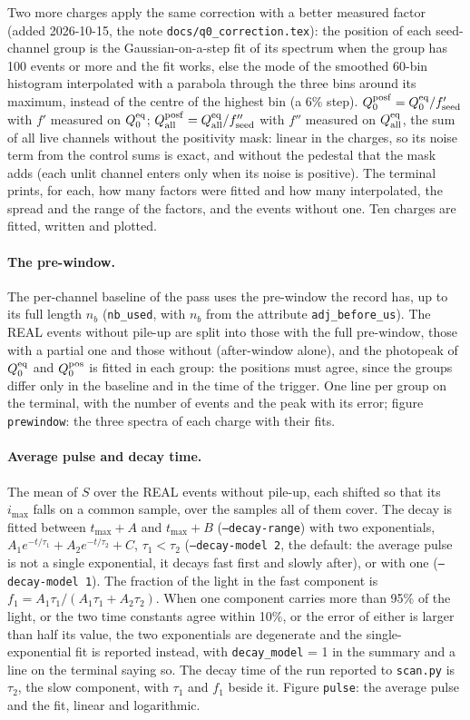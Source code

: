 \documentclass[11pt]{article}
\newcommand{\code}[1]{\texttt{#1}}
\begin{document}
Two more charges apply the same correction with a better measured
factor (added 2026-10-15, the note \code{docs/q0\_correction.tex}): the
position of each seed-channel group is the Gaussian-on-a-step fit of its
spectrum when the group has 100 events or more and the fit works, else
the mode of the smoothed 60-bin histogram interpolated with a parabola
through the three bins around its maximum, instead of the centre of the
highest bin (a 6\% step). $Q^{\rm posf}_0 = Q^{\rm eq}_0 / f'_{\rm seed}$
with $f'$ measured on $Q^{\rm eq}_0$; $Q^{\rm posf}_{\rm all} =
Q^{\rm eq}_{\rm all} / f''_{\rm seed}$ with $f''$ measured on
$Q^{\rm eq}_{\rm all}$, the sum of all live channels without the
positivity mask: linear in the charges, so its noise term from the
control sums is exact, and without the pedestal that the mask adds (each
unlit channel enters only when its noise is positive). The terminal
prints, for each, how many factors were fitted and how many
interpolated, the spread and the range of the factors, and the events
without one. Ten charges are fitted, written and plotted.

\paragraph{The pre-window.} The per-channel baseline of the pass uses
the pre-window the record has, up to its full length $n_b$
(\code{nb\_used}, with $n_b$ from the attribute \code{adj\_before\_us}).
The REAL events without pile-up are split into those with the full
pre-window, those with a partial one and those without (after-window
alone), and the photopeak of $Q^{\rm eq}_0$ and $Q^{\rm pos}_0$ is fitted
in each group: the positions must agree, since the groups differ only in
the baseline and in the time of the trigger. One line per group on the
terminal, with the number of events and the peak with its error; figure
\code{prewindow}: the three spectra of each charge with their fits.

\paragraph{Average pulse and decay time.} The mean of $S$ over the REAL
events without pile-up, each shifted so that its $i_{\max}$ falls on a
common sample, over the samples all of them cover. The decay is fitted
between $t_{\max} + A$ and $t_{\max} + B$ (\code{--decay-range}) with two
exponentials, $A_1 e^{-t/\tau_1} + A_2 e^{-t/\tau_2} + C$, $\tau_1 <
\tau_2$ (\code{--decay-model 2}, the default: the average pulse is not a
single exponential, it decays fast first and slowly after), or with one
(\code{--decay-model 1}). The fraction of the light in the fast component
is $f_1 = A_1 \tau_1 / (A_1 \tau_1 + A_2 \tau_2)$. When one component
carries more than 95\% of the light, or the two time constants agree
within 10\%, or the error of either is larger than half its value, the two
exponentials are degenerate and the single-exponential fit is reported
instead, with \code{decay\_model} = 1 in the summary and a line on the
terminal saying so. The decay time of the
run reported to \code{scan.py} is $\tau_2$, the slow component, with
$\tau_1$ and $f_1$ beside it. Figure \code{pulse}: the average pulse and
the fit, linear and logarithmic.
\end{document}
